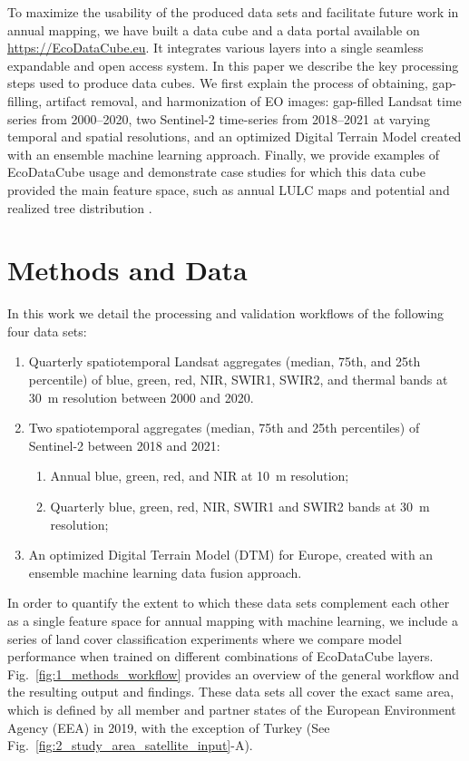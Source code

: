 To maximize the usability of the produced data sets and facilitate future work in annual mapping, we have built a data cube and a data portal available on \url{https://EcoDataCube.eu}. It integrates various layers into a single seamless expandable and open access system. In this paper we describe the key processing steps used to produce data cubes. We first explain the process of obtaining, gap-filling, artifact removal, and harmonization of EO images: gap-filled Landsat time series from 2000--2020, two Sentinel-2 time-series from 2018--2021 at varying temporal and spatial resolutions, and an optimized Digital Terrain Model created with an ensemble machine learning approach. Finally, we provide examples of EcoDataCube usage and demonstrate case studies for which this data cube provided the main feature space, such as annual LULC maps \citep{witjes2022spatiotemporal} and potential and realized tree distribution \citep{bonannella2022forest}.

\section*{Methods and Data}
In this work we detail the processing and validation workflows of the following four data sets:
\begin{enumerate}
\item Quarterly spatiotemporal Landsat aggregates (median, 75th, and 25th percentile) of blue, green, red, NIR, SWIR1, SWIR2, and thermal bands at 30~m resolution between 2000 and 2020.
\item Two spatiotemporal aggregates (median, 75th and 25th percentiles) of Sentinel-2 between 2018 and 2021:
\begin{enumerate}
\item Annual blue, green, red, and NIR at 10~m resolution;
\item Quarterly blue, green, red, NIR, SWIR1 and SWIR2 bands at 30~m resolution;
\end{enumerate}
\item An optimized Digital Terrain Model (DTM) for Europe, created with an ensemble machine learning data fusion approach.
\end{enumerate}

In order to quantify the extent to which these data sets complement each other as a single feature space for annual mapping with machine learning, we include a series of land cover classification experiments where we compare model performance when trained on different combinations of EcoDataCube layers. Fig.\@~\ref{fig:1_methods_workflow} provides an overview of the general workflow and the resulting output and findings. These data sets all cover the exact same area, which is defined by all member and partner states of the European Environment Agency (EEA) in 2019, with the exception of Turkey (See Fig.\@~\ref{fig:2_study_area_satellite_input}-A).


